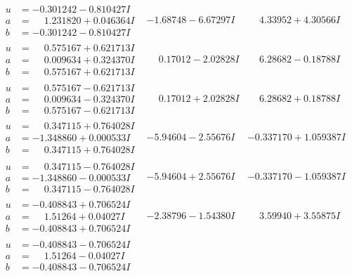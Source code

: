\documentclass[1p]{elsarticle_modified}
\theoremstyle{definition}
\begin{document}
$$\begin{array}{c|c|c}
\begin{aligned}
u &= -0.301242 - 0.810427 I \\
a &= \phantom{-}1.231820 + 0.046364 I \\
b &= -0.301242 - 0.810427 I\end{aligned}
 & -1.68748 - 6.67297 I & \phantom{-}4.33952 + 4.30566 I \\ \hline\begin{aligned}
u &= \phantom{-}0.575167 + 0.621713 I \\
a &= \phantom{-}0.009634 + 0.324370 I \\
b &= \phantom{-}0.575167 + 0.621713 I\end{aligned}
 & \phantom{-}0.17012 - 2.02828 I & \phantom{-}6.28682 - 0.18788 I \\ \hline\begin{aligned}
u &= \phantom{-}0.575167 - 0.621713 I \\
a &= \phantom{-}0.009634 - 0.324370 I \\
b &= \phantom{-}0.575167 - 0.621713 I\end{aligned}
 & \phantom{-}0.17012 + 2.02828 I & \phantom{-}6.28682 + 0.18788 I \\ \hline\begin{aligned}
u &= \phantom{-}0.347115 + 0.764028 I \\
a &= -1.348860 + 0.000533 I \\
b &= \phantom{-}0.347115 + 0.764028 I\end{aligned}
 & -5.94604 - 2.55676 I & -0.337170 + 1.059387 I \\ \hline\begin{aligned}
u &= \phantom{-}0.347115 - 0.764028 I \\
a &= -1.348860 - 0.000533 I \\
b &= \phantom{-}0.347115 - 0.764028 I\end{aligned}
 & -5.94604 + 2.55676 I & -0.337170 - 1.059387 I \\ \hline\begin{aligned}
u &= -0.408843 + 0.706524 I \\
a &= \phantom{-}1.51264 + 0.04027 I \\
b &= -0.408843 + 0.706524 I\end{aligned}
 & -2.38796 - 1.54380 I & \phantom{-}3.59940 + 3.55875 I \\ \hline\begin{aligned}
u &= -0.408843 - 0.706524 I \\
a &= \phantom{-}1.51264 - 0.04027 I \\
b &= -0.408843 - 0.706524 I\end{aligned}

\end{array}$$
\end{document}
